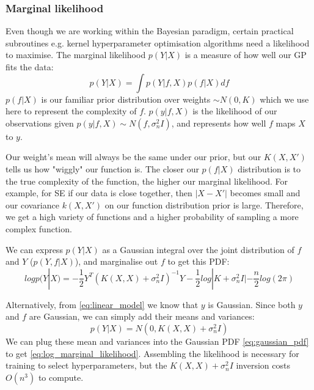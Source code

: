 \subsubsection{Marginal likelihood}
Even though we are working within the Bayesian paradigm, certain practical subroutines e.g. kernel hyperparameter optimisation algorithms need a likelihood to maximise. The marginal likelihood $p(Y|X)$ is a measure of how well our GP fits the data:
\begin{equation} \label{eq:marginal_likelihood}
    p(Y|X) = \int p(Y|f,X) p(f|X) df
\end{equation}
$p(f|X)$ is our familiar prior distribution over weights $\sim N(0, K)$ which we use here to represent the complexity of $f$. $p(y|f,X)$ is the likelihood of our observations given $p(y|f,X) \sim N(f, \sigma^2_nI)$, and represents how well $f$ maps $X$ to $y$. 

Our weight's mean will always be the same under our prior, but our $K(X,X')$ tells us how "wiggly" our function is. The closer our $p(f|X)$ distribution is to the true complexity of the function, the higher our marginal likelihood. For example, for SE if our data is close together, then $|X - X'|$ becomes small and our covariance $k(X,X')$ on our function distribution prior is large. Therefore, we get a high variety of functions and a higher probability of sampling a more complex function. %
    
We can express $p(Y|X)$ as a Gaussian integral over the joint distribution of $f$ and $Y$ ($p(Y,f|X)$), and marginalise out $f$ to get this PDF:
\begin{equation} \label{eq:log_marginal_likelihood}
    log p(Y|X) = -\frac{1}{2}Y^T(K(X,X) + \sigma^2_nI)^{-1}Y - \frac{1}{2}log|K + \sigma^2_nI| - \frac{n}{2}log(2\pi)
\end{equation}

Alternatively, from \ref{eq:linear_model} we know that $y$ is Gaussian. Since both $y$ and $f$ are Gaussian, we can simply add their means and variances: 
\begin{equation*}
    p(Y|X) = N(0, K(X, X) + \sigma^2_nI)
\end{equation*}
We can plug these mean and variances into the Gaussian PDF \ref{eq:gaussian_pdf} to get \ref{eq:log_marginal_likelihood}. Assembling the likelihood is necessary for training to select hyperparameters, but the $K(X, X) + \sigma^2_nI$ inversion costs $O(n^3)$ to compute. 


